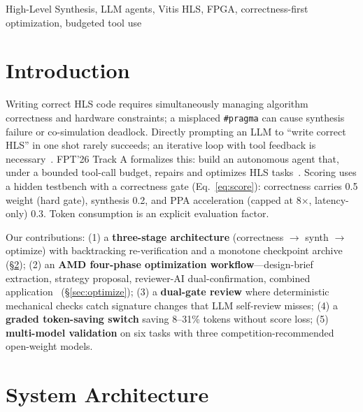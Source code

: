 \documentclass[10pt,conference,letterpaper]{IEEEtran}
\begin{document}
\begin{IEEEkeywords}
High-Level Synthesis, LLM agents, Vitis HLS, FPGA, correctness-first optimization, budgeted tool use
\end{IEEEkeywords}

\section{Introduction}

Writing correct HLS code requires simultaneously managing algorithm correctness and hardware constraints; a misplaced \texttt{\#pragma} can cause synthesis failure or co-simulation deadlock. Directly prompting an LLM to ``write correct HLS'' in one shot rarely succeeds; an iterative loop with tool feedback is necessary~\cite{react,autochip,hlsrepair}. FPT'26 Track A formalizes this: build an autonomous agent that, under a bounded tool-call budget, repairs and optimizes HLS tasks~\cite{fpt26rules}. Scoring uses a hidden testbench with a correctness gate (Eq.~\ref{eq:score}): correctness carries 0.5 weight (hard gate), synthesis 0.2, and PPA acceleration (capped at 8$\times$, latency-only) 0.3. Token consumption is an explicit evaluation factor.

Our contributions: (1) a \textbf{three-stage architecture} (correctness $\rightarrow$ synth $\rightarrow$ optimize) with backtracking re-verification and a monotone checkpoint archive (\S\ref{sec:arch}); (2) an \textbf{AMD four-phase optimization workflow}---design-brief extraction, strategy proposal, reviewer-AI dual-confirmation, combined application~\cite{amdllm4hls} (\S\ref{sec:optimize}); (3) a \textbf{dual-gate review} where deterministic mechanical checks catch signature changes that LLM self-review misses; (4) a \textbf{graded token-saving switch} saving 8--31\% tokens without score loss; (5) \textbf{multi-model validation} on six tasks with three competition-recommended open-weight models.

\section{System Architecture}
\label{sec:arch}
\end{document}
